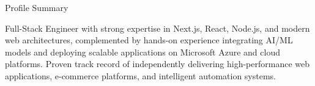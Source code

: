 \documentclass{resume} %
\begin{document}

\begin{rSection}{Profile Summary}

{Full-Stack Engineer with strong expertise in Next.js, React, Node.js, and modern web architectures, complemented by hands-on experience integrating AI/ML models and deploying scalable applications on Microsoft Azure and cloud platforms. Proven track record of independently delivering high-performance web applications, e-commerce platforms, and intelligent automation systems.}

\end{rSection}



\end{document}
